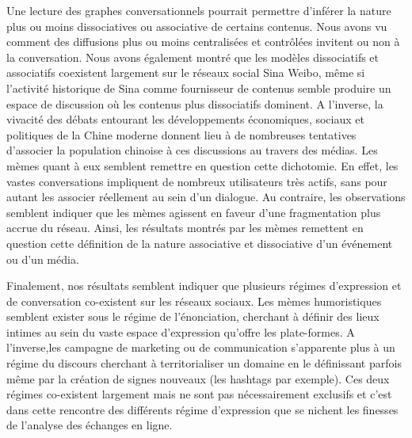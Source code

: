 Une lecture des graphes conversationnels pourrait permettre d'inférer la nature plus ou moins dissociatives ou associative de certains contenus. Nous avons vu comment des diffusions plus ou moins centralisées et contrôlées invitent ou non à la conversation. Nous avons également montré que les modèles dissociatifs et associatifs coexistent largement sur le réseaux social Sina Weibo, même si l'activité historique de Sina comme fournisseur de contenus semble produire un espace de discussion où les contenus plus dissociatifs dominent. A l{\textquoteright}inverse, la vivacité des débats entourant les développements économiques, sociaux et politiques de la Chine moderne donnent lieu à de nombreuses tentatives d{\textquoteright}associer la population chinoise à ces discussions au travers des médias. Les mèmes quant à eux semblent remettre en question cette dichotomie. En effet, les vastes conversations impliquent de nombreux utilisateurs très actifs, sans pour autant les associer réellement au sein d'un dialogue. Au contraire, les observations semblent indiquer que les mèmes agissent en faveur d'une fragmentation plus accrue du réseau. Ainsi, les résultats montrés par les mèmes remettent en question cette définition de la nature associative et dissociative d'un événement ou d'un média. 

\bigskip

Finalement, nos résultats semblent indiquer que plusieurs régimes d'expression et de conversation co-existent sur les réseaux sociaux. Les mèmes humoristiques semblent exister sous le régime de l'énonciation, cherchant à définir des lieux intimes au sein du vaste espace d'expression qu'offre les plate-formes. A l'inverse,les campagne de marketing ou de communication s'apparente plus à un régime du discours cherchant à territorialiser un domaine en le définissant parfois même par la création de signes nouveaux (les hashtags par exemple). Ces deux régimes co-existent largement mais ne sont pas nécessairement exclusifs et c'est dans cette rencontre des différents régime d'expression que se nichent les finesses de l'analyse des échanges en ligne.

